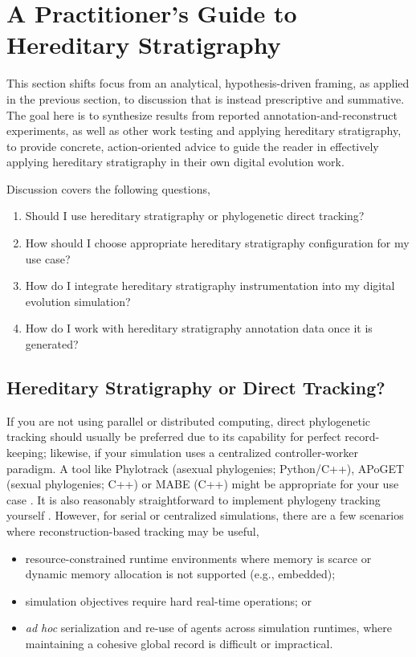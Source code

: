 \section{A Practitioner's Guide to Hereditary Stratigraphy} \label{sec:synthesis}

This section shifts focus from an analytical, hypothesis-driven framing, as applied in the previous section, to discussion that is instead prescriptive and summative.
The goal here is to synthesize results from reported annotation-and-reconstruct experiments, as well as other work testing and applying hereditary stratigraphy, to provide concrete, action-oriented advice to guide the reader in effectively applying hereditary stratigraphy in their own digital evolution work.

Discussion covers the following questions,
\begin{enumerate}
\item Should I use hereditary stratigraphy or phylogenetic direct tracking?
\item How should I choose appropriate hereditary stratigraphy configuration for my use case?
\item How do I integrate hereditary stratigraphy instrumentation into my digital evolution simulation?
\item How do I work with hereditary stratigraphy annotation data once it is generated?
\end{enumerate}

\subsection{Hereditary Stratigraphy or Direct Tracking?}

If you are not using parallel or distributed computing, direct phylogenetic tracking should usually be preferred due to its capability for perfect record-keeping; likewise, if your simulation uses a centralized controller-worker paradigm.
A tool like Phylotrack (asexual phylogenies; Python/C++), APoGET (sexual phylogenies; C++) or MABE (C++) might be appropriate for your use case \citep{dolson2024phylotrackpy,bohm2017mabe,godin2019apoget}.
It is also reasonably straightforward to implement phylogeny tracking yourself \citep{moreno2024algorithms}.
However, for serial or centralized simulations, there are a few scenarios where reconstruction-based tracking may be useful,
\begin{itemize}
\item resource-constrained runtime environments where memory is scarce or dynamic memory allocation is not supported (e.g., embedded);
\item simulation objectives require hard real-time operations; or
\item \textit{ad hoc} serialization and re-use of agents across simulation runtimes, where maintaining a cohesive global record is difficult or impractical.
\end{itemize}

